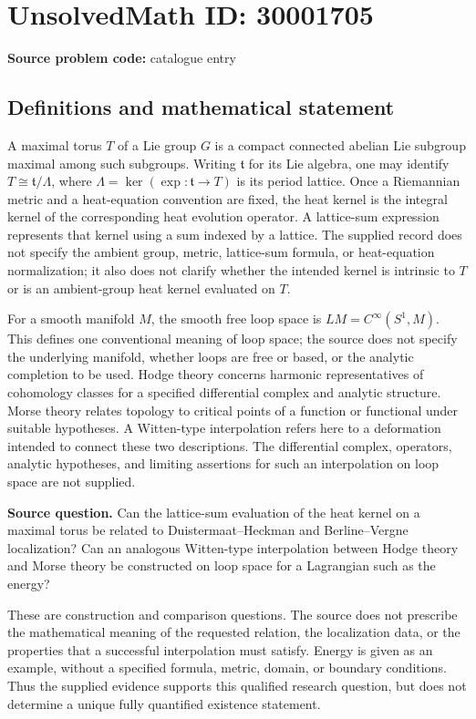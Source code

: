 \documentclass[11pt]{article}
\begin{document}
\section*{UnsolvedMath ID: 30001705}
\textbf{Source problem code:} catalogue entry
\subsection{Definitions and mathematical statement}
A maximal torus \(T\) of a Lie group \(G\) is a compact connected abelian Lie subgroup maximal among such subgroups. Writing \(\mathfrak t\) for its Lie algebra, one may identify \(T\cong\mathfrak t/\Lambda\), where \(\Lambda=\ker(\exp\colon\mathfrak t\to T)\) is its period lattice. Once a Riemannian metric and a heat-equation convention are fixed, the heat kernel is the integral kernel of the corresponding heat evolution operator. A lattice-sum expression represents that kernel using a sum indexed by a lattice. The supplied record does not specify the ambient group, metric, lattice-sum formula, or heat-equation normalization; it also does not clarify whether the intended kernel is intrinsic to \(T\) or is an ambient-group heat kernel evaluated on \(T\).

For a smooth manifold \(M\), the smooth free loop space is \(LM=C^\infty(S^1,M)\). This defines one conventional meaning of loop space; the source does not specify the underlying manifold, whether loops are free or based, or the analytic completion to be used. Hodge theory concerns harmonic representatives of cohomology classes for a specified differential complex and analytic structure. Morse theory relates topology to critical points of a function or functional under suitable hypotheses. A Witten-type interpolation refers here to a deformation intended to connect these two descriptions. The differential complex, operators, analytic hypotheses, and limiting assertions for such an interpolation on loop space are not supplied.

\textbf{Source question.} Can the lattice-sum evaluation of the heat kernel on a maximal torus be related to Duistermaat--Heckman and Berline--Vergne localization? Can an analogous Witten-type interpolation between Hodge theory and Morse theory be constructed on loop space for a Lagrangian such as the energy?

These are construction and comparison questions. The source does not prescribe the mathematical meaning of the requested relation, the localization data, or the properties that a successful interpolation must satisfy. Energy is given as an example, without a specified formula, metric, domain, or boundary conditions. Thus the supplied evidence supports this qualified research question, but does not determine a unique fully quantified existence statement.
\end{document}
